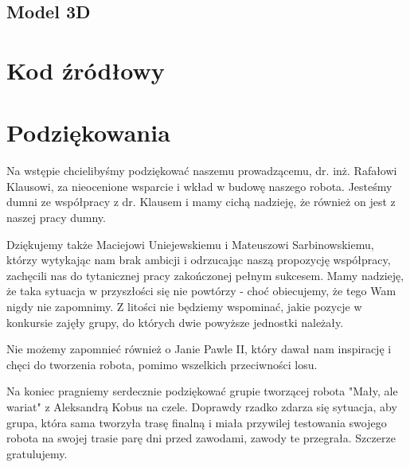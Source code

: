 \documentclass{article}
\begin{document}
\subsection{Model 3D}

\section{Kod źródłowy}



\section{Podziękowania}

Na wstępie chcielibyśmy podziękować naszemu prowadzącemu, dr. inż. Rafałowi Klausowi,  za nieocenione wsparcie i wkład w budowę naszego robota. Jesteśmy dumni ze współpracy z dr. Klausem i mamy cichą nadzieję, że również on jest z naszej pracy dumny.

Dziękujemy także Maciejowi Uniejewskiemu i Mateuszowi Sarbinowskiemu, którzy  wytykając nam brak ambicji i odrzucając naszą propozycję współpracy, zachęcili nas do tytanicznej pracy zakończonej pełnym sukcesem. Mamy nadzieję, że taka sytuacja w przyszłości się nie powtórzy - choć obiecujemy, że tego Wam nigdy nie zapomnimy. Z litości nie będziemy wspominać, jakie pozycje w konkursie zajęły grupy, do których dwie powyższe jednostki należały.

Nie możemy zapomnieć również o Janie Pawle II, który dawał nam inspirację i chęci do tworzenia robota, pomimo wszelkich przeciwności losu.

Na koniec pragniemy serdecznie podziękować grupie tworzącej robota "Mały, ale wariat" z Aleksandrą Kobus na czele. Doprawdy rzadko zdarza się sytuacja, aby grupa, która sama tworzyła trasę finalną i miała przywilej testowania swojego robota na swojej trasie parę dni przed zawodami, zawody te przegrała. Szczerze gratulujemy.


\end{document}
